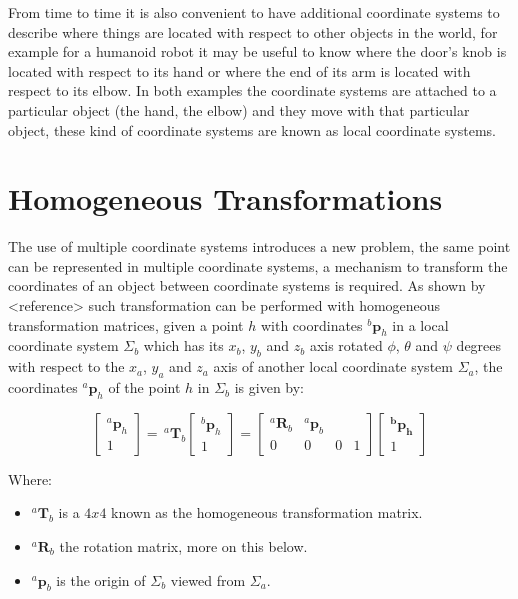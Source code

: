 \documentclass[a4paper]{report}
\begin{document}
From time to time it is also convenient to have additional coordinate systems to
describe where things are located with respect to other objects in the world, for
example for a humanoid robot it may be useful to know where the door's knob is
located with respect to its hand or where the end of its arm is located with
respect to its elbow. In both examples the coordinate systems are attached to
a particular object (the hand, the elbow) and they move with that particular
object, these kind of coordinate systems are known as local coordinate systems.


\section{Homogeneous Transformations}
The use of multiple coordinate systems introduces a new problem, the same point
can be represented in multiple coordinate systems, a mechanism to transform the
coordinates of an object between coordinate systems is required. As shown by
<reference> such transformation can be performed with homogeneous transformation
matrices, given a point $h$ with coordinates $^{b}\boldsymbol{p}_{h}$ in
a local coordinate system $\Sigma_b$ which has its $x_b$, $y_b$ and $z_b$ axis
rotated $\phi$, $\theta$ and $\psi$ degrees with respect to the $x_a$, $y_a$
and $z_a$ axis of another local coordinate system $\Sigma_{a}$, the coordinates
$^{a}\boldsymbol{p}_{h}$ of the point $h$ in $\Sigma_b$ is given by:

\begin{equation}
    \begin{bmatrix} ^{a}\boldsymbol{p}_{h} \\ 1 \end{bmatrix} = \,
        ^{a}\boldsymbol{T}_{b}
        \begin{bmatrix}
            ^{b}\boldsymbol{p}_{h} \\ 1
        \end{bmatrix} =
        \begin{bmatrix}
            ^{a}\boldsymbol{R}_{b} & ^{a}\boldsymbol{p}_{b} \\
            0 & 0 & 0 & 1
        \end{bmatrix}
        \begin{bmatrix}
            \boldsymbol{^{b}p_{h}} \\
            1
        \end{bmatrix}
\end{equation}

Where:
\begin{itemize}
    \item{} $^{a}\boldsymbol{T}_{b}$ is a $4x4$ known as the homogeneous transformation matrix.
    \item{} $^{a}\boldsymbol{R}_{b}$ the rotation matrix, more on this below.
    \item{} $^{a}\boldsymbol{p}_{b}$ is the origin of $\Sigma_{b}$ viewed from $\Sigma_{a}$.
\end{itemize}
\end{document}
